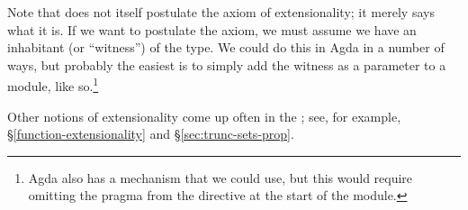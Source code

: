 \ccpad
Note that  does not itself postulate the axiom of extensionality; it merely says what it is.  If we want to postulate the axiom, we must assume we have an inhabitant (or ``witness'') of the type. We could do this in Agda in a number of ways, but probably the easiest is to simply add the witness as a parameter to a module, like so.\footnote{Agda also has a  mechanism that we could use, but this would require omitting the  pragma from the  directive at the start of the module.}
\ccpad
\begin{code}
\>[0]\AgdaSpace{}%
\AgdaSpace{}%
\AgdaSymbol{\{}\AgdaSpace{}%
\AgdaSpace{}%
\AgdaSymbol{:}\AgdaSpace{}%
\AgdaSymbol{\}\{}\AgdaSpace{}%
\AgdaSymbol{:}\AgdaSpace{}%
\AgdaSpace{}%
\AgdaSymbol{\}}\AgdaSpace{}%
\AgdaSymbol{\{}\AgdaSpace{}%
\AgdaSymbol{:}\AgdaSpace{}%
\AgdaSpace{}%
\AgdaSpace{}%
\AgdaSymbol{\}}\AgdaSpace{}%
\<%
\end{code}
\ccpad
Other notions of extensionality come up often in the \ualib; see, for example, \S\ref{function-extensionality} and \S\ref{sec:trunc-sets-prop}.

